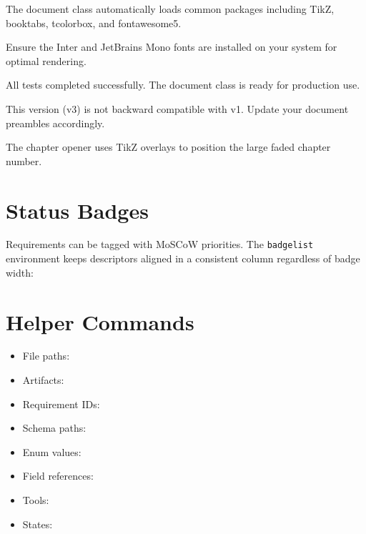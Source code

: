 \documentclass{sap-oss-apple-minimal}
\begin{document}
\begin{infobox}
The document class automatically loads common packages including TikZ, booktabs, tcolorbox, and fontawesome5.
\end{infobox}

\begin{warningbox}[Caution]
Ensure the Inter and JetBrains Mono fonts are installed on your system for optimal rendering.
\end{warningbox}

\begin{successbox}
All tests completed successfully. The document class is ready for production use.
\end{successbox}

\begin{criticalbox}
This version (v3) is not backward compatible with v1. Update your document preambles accordingly.
\end{criticalbox}

\begin{notebox}
The chapter opener uses TikZ overlays to position the large faded chapter number.
\end{notebox}

\section{Status Badges}

Requirements can be tagged with MoSCoW priorities. The \texttt{badgelist} environment keeps descriptors aligned in a consistent column regardless of badge width:

\begin{badgelist}
\end{badgelist}

\section{Helper Commands}

\begin{itemize}
  \item File paths: 
  \item Artifacts: 
  \item Requirement IDs: 
  \item Schema paths: 
  \item Enum values: 
  \item Field references: 
  \item Tools: 
  \item States: 
\end{itemize}
\end{document}
